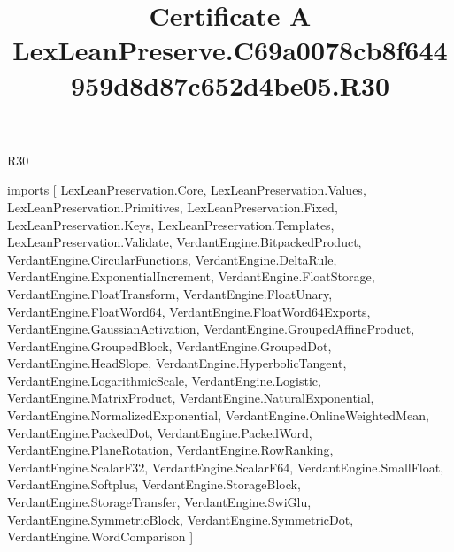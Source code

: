 \begin{lexlean}{R30}
\title{Certificate A LexLeanPreserve.C69a0078cb8f644959d8d87c652d4be05.R30}
\begin{coremodule}
imports [
  LexLeanPreservation.Core,
  LexLeanPreservation.Values,
  LexLeanPreservation.Primitives,
  LexLeanPreservation.Fixed,
  LexLeanPreservation.Keys,
  LexLeanPreservation.Templates,
  LexLeanPreservation.Validate,
  VerdantEngine.BitpackedProduct,
  VerdantEngine.CircularFunctions,
  VerdantEngine.DeltaRule,
  VerdantEngine.ExponentialIncrement,
  VerdantEngine.FloatStorage,
  VerdantEngine.FloatTransform,
  VerdantEngine.FloatUnary,
  VerdantEngine.FloatWord64,
  VerdantEngine.FloatWord64Exports,
  VerdantEngine.GaussianActivation,
  VerdantEngine.GroupedAffineProduct,
  VerdantEngine.GroupedBlock,
  VerdantEngine.GroupedDot,
  VerdantEngine.HeadSlope,
  VerdantEngine.HyperbolicTangent,
  VerdantEngine.LogarithmicScale,
  VerdantEngine.Logistic,
  VerdantEngine.MatrixProduct,
  VerdantEngine.NaturalExponential,
  VerdantEngine.NormalizedExponential,
  VerdantEngine.OnlineWeightedMean,
  VerdantEngine.PackedDot,
  VerdantEngine.PackedWord,
  VerdantEngine.PlaneRotation,
  VerdantEngine.RowRanking,
  VerdantEngine.ScalarF32,
  VerdantEngine.ScalarF64,
  VerdantEngine.SmallFloat,
  VerdantEngine.Softplus,
  VerdantEngine.StorageBlock,
  VerdantEngine.StorageTransfer,
  VerdantEngine.SwiGlu,
  VerdantEngine.SymmetricBlock,
  VerdantEngine.SymmetricDot,
  VerdantEngine.WordComparison
]


\end{coremodule}
\end{lexlean}

